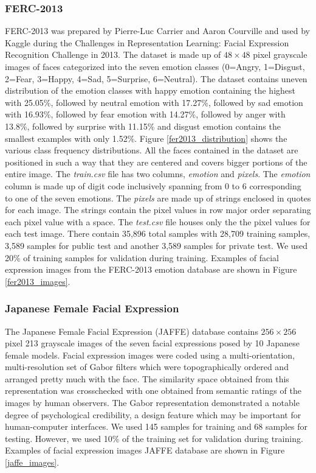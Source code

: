 \documentclass[master]{thesis-uestc}
\begin{document}
\subsubsection*{FERC-2013}
FERC-2013 was prepared by Pierre-Luc Carrier and Aaron Courville and used by Kaggle during the Challenges in Representation Learning: Facial Expression Recognition Challenge in 2013. The dataset is made up of $48\times48$ pixel grayscale images of faces categorized into the seven emotion classes (0=Angry, 1=Disgust, 2=Fear, 3=Happy, 4=Sad, 5=Surprise, 6=Neutral). The dataset contains uneven distribution of the emotion classes with happy emotion containing the highest with 25.05\%, followed by neutral emotion with 17.27\%, followed by sad emotion with 16.93\%, followed by fear emotion with 14.27\%, followed by anger with 13.8\%, followed by surprise with 11.15\% and disgust emotion contains the smallest examples with only 1.52\%. Figure \ref{fer2013_distribution} shows the various class frequency distributions.  All the faces contained in the dataset are positioned in such a way that they are centered and covers bigger portions of the entire image. The \textit{train.csv} file has two columns, \textit{emotion} and \textit{pixels}. The \textit{emotion} column is made up of digit code inclusively spanning from 0 to 6 corresponding to one of the seven emotions. The \textit{pixels} are made up of strings enclosed in quotes for each image. The strings contain the pixel values in row major order separating each pixel value with a space. The \textit{test.csv} file houses only the the pixel values for each test image. There contain 35,896 total samples with 28,709 training samples, 3,589 samples for public test and another 3,589 samples for private test. We used 20\% of training samples for validation during training. Examples of facial expression images from the FERC-2013 emotion database are shown in Figure \ref{fer2013_images}.

\subsubsection*{Japanese Female Facial Expression}
The Japanese Female Facial Expression (JAFFE) database contains $256\times256$ pixel 213 grayscale images of the seven facial expressions posed by 10 Japanese female models. Facial expression images were coded using a multi-orientation, multi-resolution set of Gabor filters which were topographically ordered and arranged pretty much with the face. The similarity space
obtained from this representation was crosschecked with one obtained from semantic ratings of the images by human observers. The Gabor representation demonstrated a notable degree of psychological credibility, a design feature which may be important for human-computer interfaces. We used 145 samples for training and 68 samples for testing. However, we used 10\% of the training set for validation during training. Examples of facial expression images JAFFE database are shown in Figure \ref{jaffe_images}.
\end{document}
